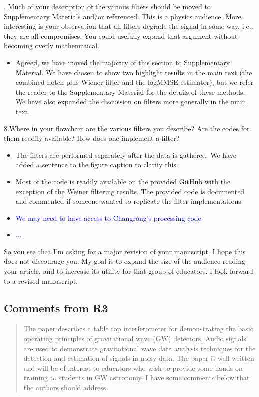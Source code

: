 \documentclass{article}
\newcommand{\todo}{\textcolor{blue}}
\begin{document}
. Much of your description of the various filters should be moved to Supplementary Materials and/or referenced.  This is a physics audience.  More interesting is your observation that all filters degrade the signal in some way, i.e., they are all compromises.  You could usefully expand that argument without becoming overly mathematical.
\begin{itemize}
\item Agreed, we have moved the majority of this section to Supplementary Material. We have chosen to show two highlight results in the main text (the combined notch plus Wiener filter and the logMMSE estimator), but we refer the reader to the Supplementary Material for the details of these methods. We have also expanded the discussion on filters more generally in the main text. 
\end{itemize}


\noindent 8.Where in your flowchart are the various filters you describe?  Are the codes for them readily available?  How does one implement a filter?  
\begin{itemize}
\item The filters are performed separately after the data is gathered. We have added a sentence to the figure caption to clarify this. 
\item Most of the code is readily available on the provided GitHub with the exception of the Weiner filtering results. The provided code is documented and commented if someone wanted to replicate the filter implementations.
\item \todo{We may need to have access to Changrong's processing code}
\item \todo{...}
\end{itemize}


\noindent So you see that I'm asking for a major revision of your manuscript.  I hope this does not discourage you.  My goal is to expand the size of the audience reading your article, and to increase its utility for that group of educators.  I look forward to a revised manuscript.



\subsection*{Comments from R3}

\begin{quote}
The paper describes a table top interferometer for demonstrating the basic operating principles of gravitational wave (GW) detectors. Audio signals are used to demonstrate gravitational wave data analysis techniques for the detection and estimation of signals in noisy data. The paper is well written and will be of interest to educators who wish to provide some hands-on training to students in GW astronomy. I have some comments below that the authors should address.
\end{quote}
\end{document}
